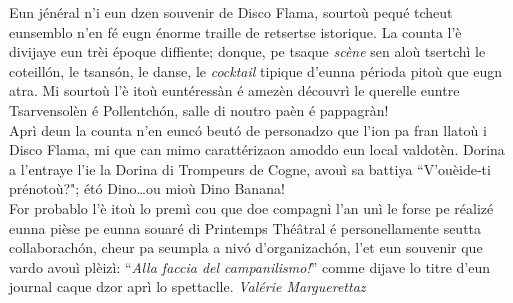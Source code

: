 \newline
\newline
\og Eun jénéral n'i eun dzen souvenir de Disco Flama, sourtoù pequé tcheut eunsemblo n'en fé eugn énorme traille de retsertse istorique. La counta l'è divijaye eun trèi époque diffiente; donque, pe tsaque \textit{scène} sen aloù tsertchì le coteill\'on, le tsans\'on, le danse, le \textit{cocktail} tipique d'eunna périoda pitoù que eugn atra. Mi sourtoù l'è itoù euntéressàn é amezèn découvrì le querelle euntre Tsarvensolèn é Pollentch\'on, salle di noutro paèn é pappagràn!
\\ Aprì deun la counta n'en eunc\'o beut\'o de personadzo que l'ion pa fran llatoù i Disco Flama, mi que can mimo carattérizaon amoddo eun local valdotèn. Dorina a l'entraye l'ie la Dorina di Trompeurs de Cogne, avouì sa battiya ``V'ouèide-ti prénotoù?"; ét\'o Dino\ldots ou mioù Dino Banana!
\\ For probablo l'è itoù lo premì cou que doe compagnì l'an unì le forse pe réalizé eunna pièse pe eunna souaré di Printemps Thé\^atral é personellamente seutta collaborach\'on, cheur pa seumpla a niv\'o d'organizach\'on, l'et eun souvenir que vardo avouì plèizì: ``\textit{Alla faccia del campanilismo!}'' comme dijave lo titre d'eun journal caque dzor aprì lo spettaclle.\fg{}
\newline
\newline
\hspace*{\fill} \textit{Valérie Marguerettaz}

